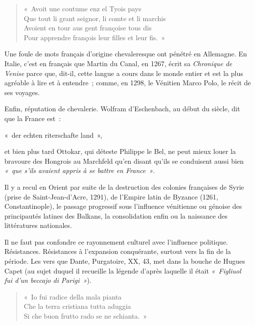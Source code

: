 \documentclass[french,twoside]{book} %
\def\mednobreak{\ifdim\lastskip<\medskipamount
  \removelastskip\nopagebreak\medskip\fi}
\newcommand{\labelblock}[1]{\medbreak{\noindent\color{rubric}\bfseries #1}\par\mednobreak}
\newenvironment{quoteblock}%
  {\begin{quoting}}
  {\end{quoting}}
\newenvironment{quotebar}{%
    \def\FrameCommand{{\color{rubric!10!}\vrule width 0.5em} \hspace{0.9em}}%
    \def\OuterFrameSep{\itemsep} %
    \MakeFramed {\advance\hsize-\width \FrameRestore}
  }%
  {%
    \endMakeFramed
  }
\renewenvironment{quoteblock}%
  {%
    \savenotes
    \setstretch{0.9}
    \normalfont
    \begin{quotebar}
  }
  {%
    \end{quotebar}
    \spewnotes
  }
\begin{document}
\begin{verse}
« Avoit une coutume enz el Tyois pays\\
Que tout li grant seignor, li comte et li marchis\\
Avoient en tour aus gent françoise tous dis\\
Pour apprendre françois leur filles et leur fis. »\\
\end{verse}

\noindent Une foule de mots français d’origine chevaleresque ont pénétré en Allemagne. En Italie, c’est en français que Martin du Canal, en 1267, écrit sa {\itshape Chronique de Venise} parce que, dit-il, cette langue a cours dans le monde entier et est la plus agréable à lire et à entendre ; comme, en 1298, le Vénitien Marco Polo, le récit de ses voyages.\par
Enfin, réputation de chevalerie. Wolfram d’Eschenbach, au début du siècle, dit que la France est :\par

\begin{quoteblock}
\noindent « der echten riterschafte land »,\end{quoteblock}

\noindent et bien plus tard Ottokar, qui déteste Philippe le Bel, ne peut mieux  
\label{p29} louer la bravoure des Hongrois au Marchfeld qu’en disant qu’ils se conduisent aussi bien \emph{« que s’ils avaient appris à se battre en France »}.\par
Il y a recul en Orient par suite de la destruction des colonies françaises de Syrie (prise de Saint-Jean-d’Acre, 1291), de l’Empire latin de Byzance (1261, Constantinople), le passage progressif sous l’influence vénitienne ou génoise des principautés latines des Balkans, la consolidation enfin ou la naissance des littératures nationales.\par

\labelblock{— Aspect politique.}

\noindent Il ne faut pas confondre ce rayonnement culturel avec l’influence politique. Résistances. Résistances à l’expansion conquérante, surtout vers la fin de la période. Les vers que Dante, Purgatoire, XX, 43, met dans la bouche de Hugues Capet (au sujet duquel il recueille la légende d’après laquelle il était \emph{« Figliuol fui d’un beccajo di Parigi »}).\par


\begin{verse}
« Io fui radice della mala pianta\\
Che la terra cristiana tutta aduggia\\
Si che buon frutto rado se ne schianta. »\\
\end{verse}
\end{document}
